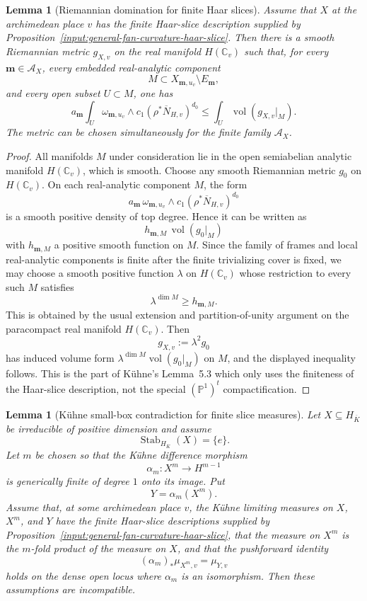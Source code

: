 \documentclass[10pt,a4paper]{amsart}
\theoremstyle{plain}
\newtheorem{lemma}[theorem]{Lemma}
\theoremstyle{plain}
\numberwithin{equation}{section}
\providecommand{\bN}{\overline{N}}
\begin{document}
\begin{lemma}[Riemannian domination for finite Haar slices]
	\label{lem:general-fan-riemannian-domination}
	Assume that \(X\) at the archimedean place \(v\) has the finite Haar-slice
	description supplied by
	Proposition~\ref{input:general-fan-curvature-haar-slice}.  Then there is a
	smooth Riemannian metric
	\(g_{X,v}\) on the real manifold \(H(\mathbb C_v)\) such that, for every
	\(\mathbf m\in\mathcal A_X\), every embedded real-analytic component
	\[
	M\subset X_{\mathbf m,u_v}\setminus E_{\mathbf m},
	\]
	and every open subset \(U\subset M\), one has
	\[
	a_{\mathbf m}
	\int_U
	\omega_{\mathbf m,u_v}\wedge c_1(\rho^*\bN_{H,v})^{d_0}
	\le
	\int_U \operatorname{vol}(g_{X,v}|_M).
	\]
	The metric can be chosen simultaneously for the finite family
	\(\mathcal A_X\).
\end{lemma}

\begin{proof}
	All manifolds \(M\) under consideration lie in the open semiabelian analytic
	manifold \(H(\mathbb C_v)\), which is smooth.  Choose any smooth Riemannian
	metric \(g_0\) on \(H(\mathbb C_v)\).  On each real-analytic component \(M\),
	the form
	\[
	a_{\mathbf m}\,
	\omega_{\mathbf m,u_v}\wedge c_1(\rho^*\bN_{H,v})^{d_0}
	\]
	is a smooth positive density of top degree.  Hence it can be written as
	\[
	h_{\mathbf m,M}\,\operatorname{vol}(g_0|_M)
	\]
	with \(h_{\mathbf m,M}\) a positive smooth function on \(M\).  Since the family
	of frames and local real-analytic components is finite after the finite
	trivializing cover is fixed, we may choose a smooth positive function
	\(\lambda\) on \(H(\mathbb C_v)\) whose restriction to every such \(M\)
	satisfies
	\[
	\lambda^{\dim M}\ge h_{\mathbf m,M}.
	\]
	This is obtained by the usual extension and partition-of-unity argument on the
	paracompact real manifold \(H(\mathbb C_v)\).  Then
	\[
	g_{X,v}:=\lambda^2g_0
	\]
	has induced volume form
	\(\lambda^{\dim M}\operatorname{vol}(g_0|_M)\) on \(M\), and the displayed
	inequality follows.  This is the part of K\"uhne's Lemma~5.3 which only uses
	the finiteness of the Haar-slice description, not the special
	\((\mathbb P^1)^t\) compactification.
\end{proof}

\begin{lemma}[K\"uhne small-box contradiction for finite slice measures]
	\label{lem:kuhne-small-box-contradiction-finite-slices}
	Let \(X\subseteq H_{\overline K}\) be irreducible of positive dimension and
	assume
	\[
	\operatorname{Stab}_{H_{\overline K}}(X)=\{e\}.
	\]
	Let \(m\) be chosen so that the K\"uhne difference morphism
	\[
	\alpha_m:X^m\longrightarrow H^{m-1}
	\]
	is generically finite of degree \(1\) onto its image.  Put
	\[
	Y=\alpha_m(X^m).
	\]
	Assume that, at some archimedean place \(v\), the K\"uhne limiting measures on
	\(X\), \(X^m\), and \(Y\) have the finite Haar-slice descriptions supplied by
	Proposition~\ref{input:general-fan-curvature-haar-slice}, that the measure on
	\(X^m\) is the \(m\)-fold product of the measure on \(X\), and that the
	pushforward identity
	\[
	(\alpha_m)_*\mu_{X^m,v}=\mu_{Y,v}
	\]
	holds on the dense open locus where \(\alpha_m\) is an isomorphism.  Then these
	assumptions are incompatible.
\end{lemma}
\end{document}
